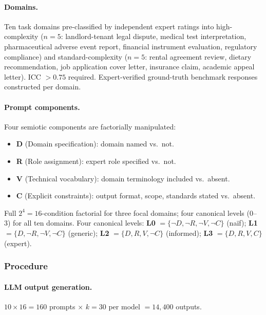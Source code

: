 \documentclass[12pt,a4paper]{article}
\begin{document}
\paragraph{Domains.} Ten task domains pre-classified by independent expert
ratings into high-complexity ($n = 5$: landlord-tenant legal dispute, medical
test interpretation, pharmaceutical adverse event report, financial instrument
evaluation, regulatory compliance) and standard-complexity ($n = 5$: rental
agreement review, dietary recommendation, job application cover letter,
insurance claim, academic appeal letter). ICC $> 0.75$ required.
Expert-verified ground-truth benchmark responses constructed per domain.

\paragraph{Prompt components.} Four semiotic components are factorially
manipulated:
\begin{itemize}
\item \textbf{D} (Domain specification): domain named vs.\ not.
\item \textbf{R} (Role assignment): expert role specified vs.\ not.
\item \textbf{V} (Technical vocabulary): domain terminology included vs.\ absent.
\item \textbf{C} (Explicit constraints): output format, scope, standards stated
      vs.\ absent.
\end{itemize}

Full $2^4 = 16$-condition factorial for three focal domains; four canonical
levels (0--3) for all ten domains. Four canonical levels: \textbf{L0}
$= \{\neg D, \neg R, \neg V, \neg C\}$ (na\"if); \textbf{L1} $= \{D, \neg R,
\neg V, \neg C\}$ (generic); \textbf{L2} $= \{D, R, V, \neg C\}$ (informed);
\textbf{L3} $= \{D, R, V, C\}$ (expert).

\subsubsection{Procedure}

\paragraph{LLM output generation.} $10 \times 16 = 160$ prompts $\times$
$k = 30$ per model $= 14{,}400$ outputs.
\end{document}
